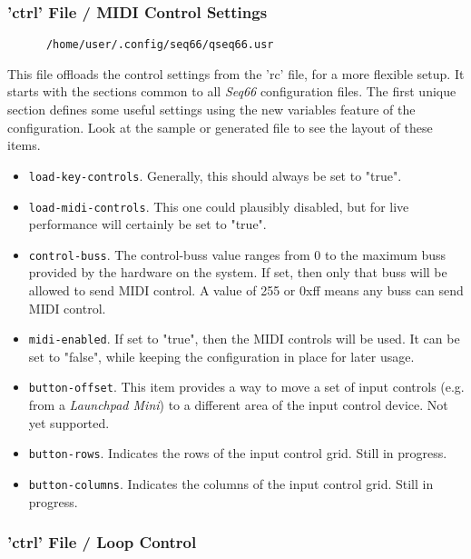 \subsubsection{'ctrl' File / MIDI Control Settings}
\label{subsubsec:configuration_ctrl_midi_control_settings}

   \begin{verbatim}
      /home/user/.config/seq66/qseq66.usr
   \end{verbatim}

   This file offloads the control settings from the 'rc' file, for a more
   flexible setup. It starts with the sections common to all \textsl{Seq66}
   configuration files.  The first unique section defines some useful settings
   using the new variables feature of the configuration.  Look at the sample or
   generated file to see the layout of these items.

   \begin{itemize}
      \item \texttt{load-key-controls}.
         Generally, this should always be set to "true".
      \item \texttt{load-midi-controls}.
         This one could plausibly disabled, but for live performance will
         certainly be set to "true".
      \item \texttt{control-buss}.
         The control-buss value ranges from 0 to the maximum buss provided by
         the hardware on the system. If set, then only that buss will be allowed
         to send MIDI control.  A value of 255 or 0xff means any buss can send
         MIDI control.
      \item \texttt{midi-enabled}.
         If set to "true", then the MIDI controls will be used.
         It can be set to "false", while keeping the configuration in place
         for later usage.
      \item \texttt{button-offset}.
         This item provides a way to move a set of input controls (e.g. from a
         \textsl{Launchpad Mini}) to a different area of the input control
         device.  Not yet supported.
      \item \texttt{button-rows}.
         Indicates the rows of the input control grid.
         Still in progress.
      \item \texttt{button-columns}.
         Indicates the columns of the input control grid.
         Still in progress.
   \end{itemize}

\subsubsection{'ctrl' File / Loop Control}
\label{subsubsec:configuration_ctrl_loop_control}

